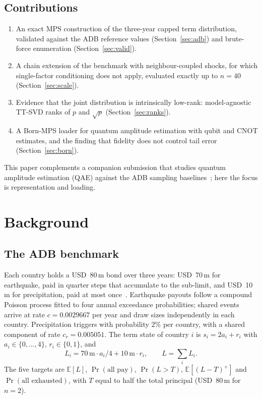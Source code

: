\documentclass[conference]{IEEEtran}
\newcommand{\Ex}{\mathbb{E}}
\begin{document}
\subsection{Contributions}
\begin{enumerate}
\item An exact MPS construction of the three-year capped term distribution, validated against the ADB reference
values (Section~\ref{sec:adb}) and brute-force enumeration (Section~\ref{sec:valid}).
\item A chain extension of the benchmark with neighbour-coupled shocks, for which single-factor conditioning
does not apply, evaluated exactly up to $n=40$ (Section~\ref{sec:scale}).
\item Evidence that the joint distribution is intrinsically low-rank: model-agnostic TT-SVD ranks of $p$ and
$\sqrt{p}$ (Section~\ref{sec:ranks}).
\item A Born-MPS loader for quantum amplitude estimation with qubit and CNOT estimates, and the finding that
fidelity does not control tail error (Section~\ref{sec:born}).
\end{enumerate}
This paper complements a companion submission that studies quantum amplitude estimation (QAE) against the ADB
sampling baselines~\cite{paper1}; here the focus is representation and loading.

\section{Background}
\subsection{The ADB benchmark}
Each country holds a USD~80\,m bond over three years: USD~70\,m for earthquake, paid in quarter steps that
accumulate to the sub-limit, and USD~10\,m for precipitation, paid at most once~\cite{brief}. Earthquake payouts
follow a compound Poisson process fitted to four annual exceedance probabilities; shared events arrive at rate
$c=0.0029667$ per year and draw sizes independently in each country. Precipitation triggers with probability $2\%$
per country, with a shared component of rate $c_r=0.005051$. The term state of country $i$ is $s_i=2a_i+r_i$ with
$a_i\in\{0,\dots,4\}$, $r_i\in\{0,1\}$, and
\begin{equation}
L_i=70\,\text{m}\cdot a_i/4+10\,\text{m}\cdot r_i,\qquad L=\textstyle\sum_iL_i .
\end{equation}
The five targets are $\Ex[L]$, $\Pr(\text{all pay})$, $\Pr(L>T)$, $\Ex[(L-T)^{+}]$ and $\Pr(\text{all exhausted})$, with
$T$ equal to half the total principal (USD~80\,m for $n=2$).
\end{document}
